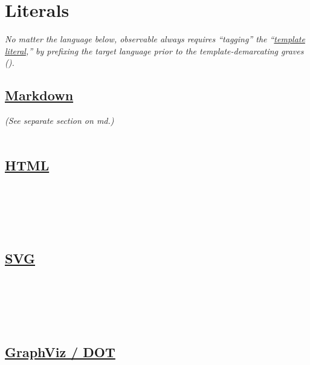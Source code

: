 \section{Literals}

\textit{No matter the language below, observable always requires ``tagging'' the ``\href{https://exploringjs.com/es6/ch_template-literals.html\#\_tagged-template-literals}{template literal},'' by prefixing the target language prior to the template-demarcating graves (}\cde{\textasciigrave}\textit{).}

\subsection*{\href{}{Markdown}}
\textit{(See separate section on md.)}\\
\\


\subsection*{\href{https://observablehq.com/@observablehq/introduction-to-html?collection=@observablehq/notebook-fundamentals}{HTML}}
\\
\\
\\
\\

\subsection*{\href{https://observablehq.com/@observablehq/htl}{SVG}}
\\
\\
\\
\\


\subsection*{\href{https://observablehq.com/@observablehq/graphviz}{GraphViz / DOT}}
\\

